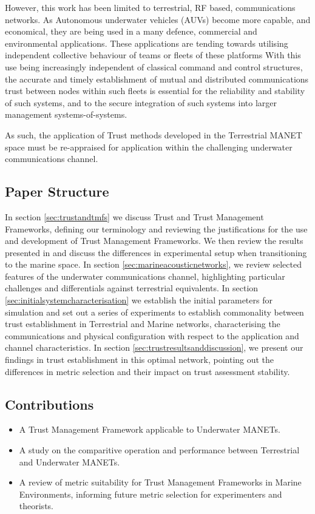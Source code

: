 \documentclass[runningheads,a4paper]{llncs}
\begin{document}
However, this work has been limited to terrestrial, RF based, communications networks.
As Autonomous underwater vehicles (AUVs) become more capable, and economical, they are being used in a many defence, commercial and environmental applications. 
These applications are tending towards utilising  independent collective behaviour of teams or fleets of these platforms \cite{Caiti2011}
With this use being increasingly independent of classical command and control structures, the accurate and timely establishment of mutual and distributed communications trust between nodes within such fleets is essential for the reliability and stability of such systems, and to the secure integration of such systems into larger management systems-of-systems. 

As such, the application of Trust methods developed in the Terrestrial MANET space must be re-appraised for application within the challenging underwater communications channel.

\subsection{Paper Structure}

In section \ref{sec:trustandtmfs} we discuss Trust and Trust Management Frameworks, defining our terminology and reviewing the justifications for the use and development of Trust Management Frameworks. We then review the results presented in \cite{Guo11} and discuss the differences in experimental setup when transitioning to the marine space.
In section \ref{sec:marineacousticnetworks}, we review selected features of the underwater communications channel, highlighting particular challenges and differentials against terrestrial equivalents. 
In section \ref{sec:initialsystemcharacterisation} we establish the initial parameters for simulation and set out a series of experiments to establish commonality between trust establishment in Terrestrial and Marine networks, characterising the communications and physical configuration with respect to the application and channel characteristics.
In section \ref{sec:trustresultsanddiscussion}, we present our findings in trust establishment in this optimal network, pointing out the differences in metric selection and their impact on trust assessment stability.

\subsection{Contributions}
\begin{itemize}
  \item A Trust Management Framework applicable to Underwater MANETs.
  \item A study on the comparitive operation and performance between Terrestrial and Underwater MANETs.
  \item A review of metric suitability for Trust Management Frameworks in Marine Environments, informing future metric selection for experimenters and theorists.
\end{itemize}
\end{document}
